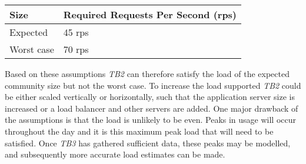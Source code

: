 \begin {table}[H]
\begin{center}
\begin{tabular}{ |p{2cm}||p{6cm}| }
 \hline
 Size & Required Requests Per Second (rps)\\
 \hline
    Expected & 45 rps\\
 \hline
    Worst case & 70 rps\\
 \hline
\end{tabular}
\end{center}
\end{table}
Based on these assumptions \textit{TB2} can therefore satisfy the load of the expected community size but not the worst case. To increase the load supported \textit{TB2} could be either scaled vertically or horizontally, such that the application server size is increased or a load balancer and other servers are added. 
One major drawback of the assumptions is that the load is unlikely to be even. Peaks in usage will occur throughout the day and it is this maximum peak load that will need to be satisfied. Once \textit{TB3} has gathered sufficient data, these peaks may be modelled, and subsequently more accurate load estimates can be made.
